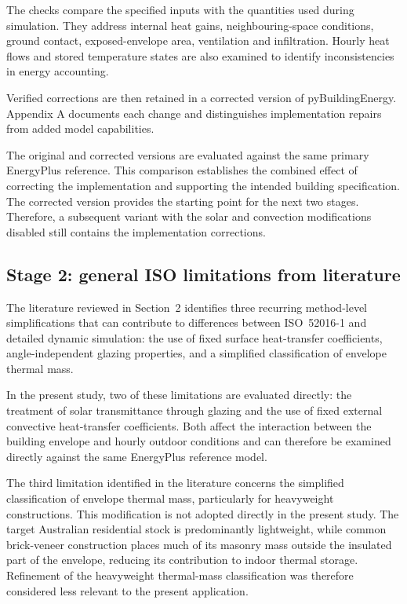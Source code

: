 \documentclass[12pt, a4paper]{article}
\begin{document}
The checks compare the specified inputs with the quantities used during simulation. They address internal heat gains, neighbouring-space conditions, ground contact, exposed-envelope area, ventilation and infiltration. Hourly heat flows and stored temperature states are also examined to identify inconsistencies in energy accounting.

Verified corrections are then retained in a corrected version of pyBuildingEnergy. Appendix A documents each change and distinguishes implementation repairs from added model capabilities.

The original and corrected versions are evaluated against the same primary EnergyPlus reference. This comparison establishes the combined effect of correcting the implementation and supporting the intended building specification.
The corrected version provides the starting point for the next two stages. Therefore, a subsequent variant with the solar and convection modifications disabled still contains the implementation corrections.



\subsection{Stage 2: general ISO limitations from literature}
\label{sec:general ISO limitations from literature}

The literature reviewed in Section~2 identifies three recurring method-level
simplifications that can contribute to differences between ISO~52016-1 and
detailed dynamic simulation: the use of fixed surface heat-transfer
coefficients, angle-independent glazing properties, and a simplified
classification of envelope thermal mass.

In the present study, two of these limitations are evaluated directly:
the treatment of solar transmittance through glazing and the use of fixed
external convective heat-transfer coefficients. Both affect the interaction
between the building envelope and hourly outdoor conditions and can therefore
be examined directly against the same EnergyPlus reference model.

The third limitation identified in the literature concerns the simplified
classification of envelope thermal mass, particularly for heavyweight
constructions. This modification is not adopted directly in the present study.
The target Australian residential stock is predominantly lightweight, while
common brick-veneer construction places much of its masonry mass outside the
insulated part of the envelope, reducing its contribution to indoor thermal
storage. Refinement of the heavyweight thermal-mass classification was therefore
considered less relevant to the present application.
\end{document}
